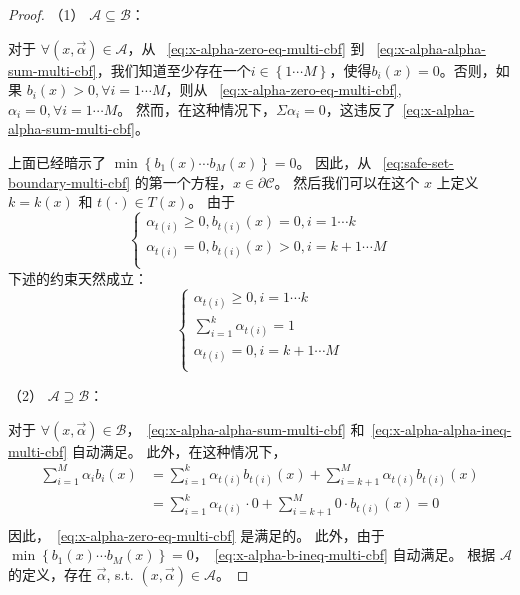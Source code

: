 \begin{proof}
    
（1） $\mathcal{A} \subseteq \mathcal{B}$：

对于 $\forall \left( x,\overrightarrow{\alpha } \right) \in \mathcal{A}$，从 ~\eqref{eq:x-alpha-zero-eq-multi-cbf} 到 ~\eqref{eq:x-alpha-alpha-sum-multi-cbf}，我们知道至少存在一个$i \in \left\{ 1 \cdots M \right\}$，使得$b_i(x) = 0$。否则，如果 $b_i(x) > 0, \forall i=1\cdots M$，则从 ~\eqref{eq:x-alpha-zero-eq-multi-cbf}, $\alpha_i = 0, \forall i=1\cdots M$。 然而，在这种情况下，$\Sigma \alpha_i = 0$，这违反了~\eqref{eq:x-alpha-alpha-sum-multi-cbf}。

上面已经暗示了 $\min \left\{ b_1(x) \cdots b_M(x) \right\} = 0$。 因此，从 ~\eqref{eq:safe-set-boundary-multi-cbf} 的第一个方程，$x \in \partial \mathcal{C}$。 然后我们可以在这个 $x$ 上定义 $k=k(x)$ 和 $t(\cdot) \in T(x)$。 由于
\begin{equation}
\begin{cases}
	\alpha _{t\left( i \right)}\ge 0,b_{t\left( i \right)}\left( x \right) =0,i=1\cdots k\\
	\alpha _{t\left( i \right)}=0,b_{t\left( i \right)}\left( x \right) >0,i=k+1\cdots M\\
\end{cases}
\end{equation}
下述的约束天然成立：
\begin{equation} \label{eq:hierachical-alpha-multi-cbf}
\begin{cases}
	\alpha _{t\left( i \right)}\ge 0,i=1\cdots k\\
	\sum_{i=1}^k{\alpha _{t\left( i \right)}}=1\\
	\alpha _{t\left( i \right)}=0,i=k+1\cdots M\\
\end{cases}
\end{equation}

（2） $\mathcal{A} \supseteq \mathcal{B}$：

对于 $\forall (x, \overrightarrow{\alpha}) \in \mathcal{B}$，~\eqref{eq:x-alpha-alpha-sum-multi-cbf} 和~\eqref{eq:x-alpha-alpha-ineq-multi-cbf} 自动满足。 此外，在这种情况下，
\begin{equation}
\begin{aligned}
	\sum_{i=1}^M{\alpha _ib_i\left( x \right)}&=\sum_{i=1}^k{\alpha _{t\left( i \right)}b_{t\left( i \right)}\left( x \right)}+\sum_{i=k+1}^M{\alpha _{t\left( i \right)}b_{t\left( i \right)}\left( x \right)}\\
	&=\sum_{i=1}^k{\alpha _{t\left( i \right)}\cdot 0}+\sum_{i=k+1}^M{0\cdot b_{t\left( i \right)}\left( x \right)}=0\\
\end{aligned}
\end{equation}
因此，~\eqref{eq:x-alpha-zero-eq-multi-cbf} 是满足的。 此外，由于 $\min \left\{ b_1(x) \cdots b_M(x) \right\} = 0$，~\eqref{eq:x-alpha-b-ineq-multi-cbf} 自动满足。 根据 $\mathcal{A}$ 的定义，存在 $\overrightarrow{\alpha}$, s.t. $\left( x,\overrightarrow{\alpha } \right) \in \mathcal{A}$。

\end{proof}

